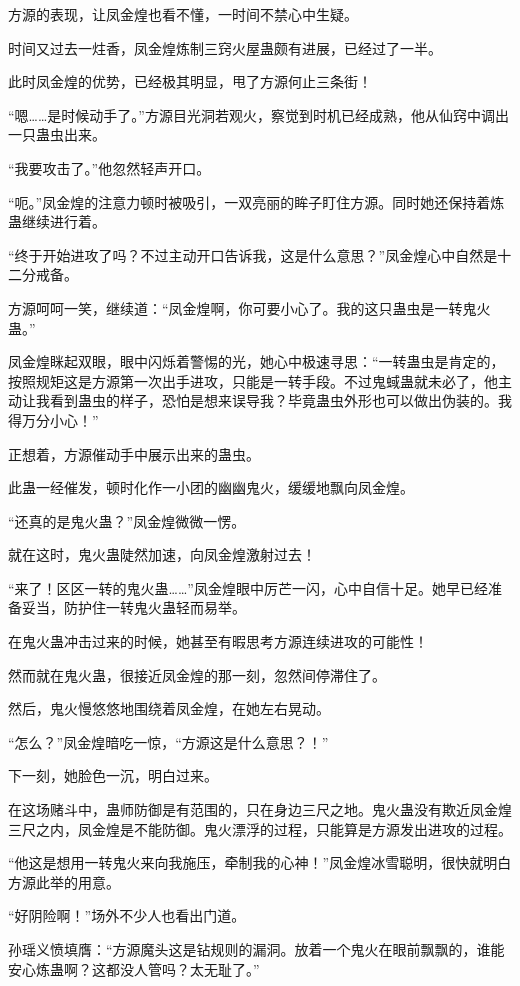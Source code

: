 \begin{this_body}
方源的表现，让凤金煌也看不懂，一时间不禁心中生疑。

时间又过去一炷香，凤金煌炼制三窍火屋蛊颇有进展，已经过了一半。

此时凤金煌的优势，已经极其明显，甩了方源何止三条街！

“嗯……是时候动手了。”方源目光洞若观火，察觉到时机已经成熟，他从仙窍中调出一只蛊虫出来。

“我要攻击了。”他忽然轻声开口。

“呃。”凤金煌的注意力顿时被吸引，一双亮丽的眸子盯住方源。同时她还保持着炼蛊继续进行着。

“终于开始进攻了吗？不过主动开口告诉我，这是什么意思？”凤金煌心中自然是十二分戒备。

方源呵呵一笑，继续道：“凤金煌啊，你可要小心了。我的这只蛊虫是一转鬼火蛊。”

凤金煌眯起双眼，眼中闪烁着警惕的光，她心中极速寻思：“一转蛊虫是肯定的，按照规矩这是方源第一次出手进攻，只能是一转手段。不过鬼蜮蛊就未必了，他主动让我看到蛊虫的样子，恐怕是想来误导我？毕竟蛊虫外形也可以做出伪装的。我得万分小心！”

正想着，方源催动手中展示出来的蛊虫。

此蛊一经催发，顿时化作一小团的幽幽鬼火，缓缓地飘向凤金煌。

“还真的是鬼火蛊？”凤金煌微微一愣。

就在这时，鬼火蛊陡然加速，向凤金煌激射过去！

“来了！区区一转的鬼火蛊……”凤金煌眼中厉芒一闪，心中自信十足。她早已经准备妥当，防护住一转鬼火蛊轻而易举。

在鬼火蛊冲击过来的时候，她甚至有暇思考方源连续进攻的可能性！

然而就在鬼火蛊，很接近凤金煌的那一刻，忽然间停滞住了。

然后，鬼火慢悠悠地围绕着凤金煌，在她左右晃动。

“怎么？”凤金煌暗吃一惊，“方源这是什么意思？！”

下一刻，她脸色一沉，明白过来。

在这场赌斗中，蛊师防御是有范围的，只在身边三尺之地。鬼火蛊没有欺近凤金煌三尺之内，凤金煌是不能防御。鬼火漂浮的过程，只能算是方源发出进攻的过程。

“他这是想用一转鬼火来向我施压，牵制我的心神！”凤金煌冰雪聪明，很快就明白方源此举的用意。

“好阴险啊！”场外不少人也看出门道。

孙瑶义愤填膺：“方源魔头这是钻规则的漏洞。放着一个鬼火在眼前飘飘的，谁能安心炼蛊啊？这都没人管吗？太无耻了。”


\end{this_body}
